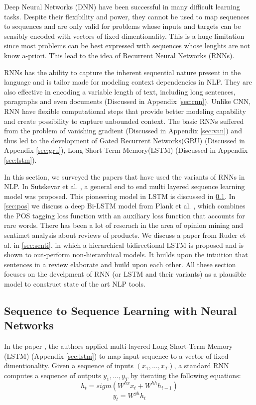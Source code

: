 \documentclass{article}
\begin{document}
	Deep Neural Networks (DNN) have been successful in many difficult learning tasks. Despite their flexibility and power, they cannot be used to map sequences to sequences and are only valid for problems whose inputs and targets can be sensibly encoded with vectors of fixed dimentionality. This is a huge limitation since most problems can be best expressed with sequences whose lenghts are not know a-priori. This lead to the idea of Recurrent Neural Networks (RNNs).
	
	RNNs has the ability to capture the inherent sequential nature present in the language and is tailor made for modeling context dependencies in NLP. They are also effective in encoding a variable length of text, including long sentences, paragraphs and even documents (Discussed in Appendix \ref{sec:rnn}). Unlike CNN, RNN have flexible computational steps that provide better modeling capability and create possibility to capture unbounded context. The basic RNNs suffered from the problem of vanishing gradient (Discussed in Appendix \ref{sec:van}) and thus led to the development of Gated Recurrent Networks(GRU) (Discussed in Appendix \ref{sec:gru}), Long Short Term Memory(LSTM) (Discussed in Appendix \ref{sec:lstm}).
	
	In this section, we surveyed the papers that have used the variants of RNNs in NLP. In Sutskevar et al. \cite{suts}, a general end to end multi layered sequence learning model was proposed. This pioneering model in LSTM is discussed in \ref{sec:suts}. In \ref{sec:pos} we discuss a deep Bi-LSTM model from Plank et al. \cite{pos}, which combines the POS tagging loss function with an auxiliary loss function that accounts for rare words. There has been a lot of reserach in the area of opinion mining and sentimet analysis about reviews of products. We discuss a paper from Ruder et al. in \ref{sec:senti}, in which a hierarchical bidirectional LSTM is proposed and is shown to out-perform non-hierarchical models. It builds upon the intuition that sentences in a review elaborate and build upon each other. All these section focuses on the develpment of RNN (or LSTM and their variants) as a plausible model to construct state of the art NLP tools. 

\subsection{Sequence to Sequence Learning with Neural Networks}
\label{sec:suts}
	
	In the paper \cite{suts}, the authors applied multi-layered Long Short-Term Memory (LSTM) (Appendix \ref{sec:lstm}) to map input sequence to a vector of fixed dimentionality. Given a sequence of inputs \((x_1, ... , x_T)\), a standard RNN computes a sequence of outputs \(y_1, ..., y_T\) by iterating the following equations:
	\[h_t = sigm(W^{hx} x_t + W^{hh} h_{t-1})\]
	\[y_t = W^{yh} h_t\]
	
\end{document}
